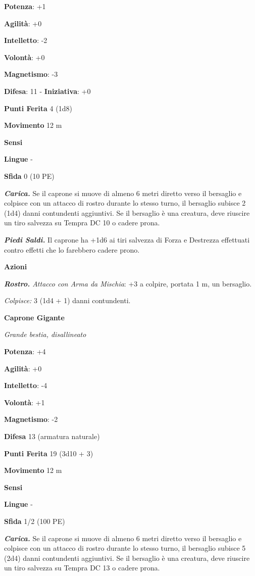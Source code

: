 \begin{multicols}{2}
\textbf{Potenza}: +1

\textbf{Agilità}: +0

\textbf{Intelletto}: -2

\textbf{Volontà}: +0

\textbf{Magnetismo}: -3

\textbf{Difesa}: 11 - \textbf{Iniziativa}: +0

\textbf{Punti Ferita} 4 (1d8)

\textbf{Movimento} 12 m

\textbf{Sensi} 

\textbf{Lingue} -

\textbf{Sfida} 0 (10 PE)\smallskip

\emph{\textbf{Carica.}} Se il caprone si muove di almeno 6 metri diretto
verso il bersaglio e colpisce con un attacco di rostro durante lo stesso
turno, il bersaglio subisce 2 (1d4) danni contundenti aggiuntivi. Se il
bersaglio è una creatura, deve riuscire un tiro salvezza su Tempra DC 10
o cadere prona.

\emph{\textbf{Piedi Saldi.}} Il caprone ha +1d6 ai tiri salvezza di
Forza e Destrezza effettuati contro effetti che lo farebbero cadere
prono.

\smallskip\textbf{Azioni}

\emph{\textbf{Rostro.} Attacco con Arma da Mischia}: +3 a colpire,
portata 1 m, un bersaglio.

\emph{Colpisce:} 3 (1d4 + 1) danni contundenti.

\textbf{Caprone Gigante}

\emph{Grande bestia, disallineato}

\textbf{Potenza}: +4

\textbf{Agilità}: +0

\textbf{Intelletto}: -4

\textbf{Volontà}: +1

\textbf{Magnetismo}: -2

\textbf{Difesa} 13 (armatura naturale)

\textbf{Punti Ferita} 19 (3d10 + 3)

\textbf{Movimento} 12 m

\textbf{Sensi} 

\textbf{Lingue} -

\textbf{Sfida} 1/2 (100 PE)\smallskip

\emph{\textbf{Carica.}} Se il caprone si muove di almeno 6 metri diretto
verso il bersaglio e colpisce con un attacco di rostro durante lo stesso
turno, il bersaglio subisce 5 (2d4) danni contundenti aggiuntivi. Se il
bersaglio è una creatura, deve riuscire un tiro salvezza su Tempra DC 13
o cadere prona.


\end{multicols}
